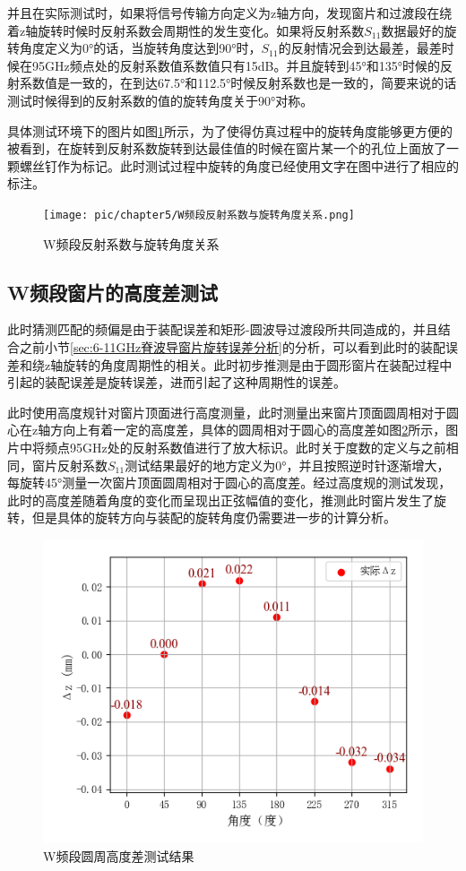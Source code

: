 \documentclass[master]{thesis-uestc}
\begin{document}
并且在实际测试时，如果将信号传输方向定义为z轴方向，发现窗片和过渡段在绕着z轴旋转时候时反射系数会周期性的发生变化。如果将反射系数$S_{11}$数据最好的旋转角度定义为0°的话，当旋转角度达到90°时，$S_{11}$的反射情况会到达最差，最差时候在95GHz频点处的反射系数值系数值只有15dB。并且旋转到45°和135°时候的反射系数值是一致的，在到达67.5°和112.5°时候反射系数也是一致的，简要来说的话测试时候得到的反射系数的值的旋转角度关于90°对称。

具体测试环境下的图片如图\ref{fig:W频段反射系数与旋转角度关系}所示，为了使得仿真过程中的旋转角度能够更方便的被看到，在旋转到反射系数旋转到达最佳值的时候在窗片某一个的孔位上面放了一颗螺丝钉作为标记。此时测试过程中旋转的角度已经使用文字在图中进行了相应的标注。
\begin{figure}[!htb]
    \centering
    \texttt{[image: pic/chapter5/W频段反射系数与旋转角度关系.png]}
    \caption{W频段反射系数与旋转角度关系}
    \label{fig:W频段反射系数与旋转角度关系}
\end{figure}

\subsection{W频段窗片的高度差测试}
此时猜测匹配的频偏是由于装配误差和矩形-圆波导过渡段所共同造成的，并且结合之前小节\ref{sec:6-11GHz脊波导窗片旋转误差分析}的分析，可以看到此时的装配误差和绕z轴旋转的角度周期性的相关。此时初步推测是由于圆形窗片在装配过程中引起的装配误差是旋转误差，进而引起了这种周期性的误差。

此时使用高度规针对窗片顶面进行高度测量，此时测量出来窗片顶面圆周相对于圆心在z轴方向上有着一定的高度差，具体的圆周相对于圆心的高度差如图\ref{fig:W频段圆周高度差测试结果}所示，图片中将频点95GHz处的反射系数值进行了放大标识。此时关于度数的定义与之前相同，窗片反射系数$S_{11}$测试结果最好的地方定义为0°，并且按照逆时针逐渐增大，每旋转45°测量一次窗片顶面圆周相对于圆心的高度差。经过高度规的测试发现，此时的高度差随着角度的变化而呈现出正弦幅值的变化，推测此时窗片发生了旋转，但是具体的旋转方向与装配的旋转角度仍需要进一步的计算分析。
\begin{figure}[!htb]
    \centering
    \includegraphics[width=0.5\linewidth]{pic/chapter5/可视化高度差.png}
    \caption{W频段圆周高度差测试结果}
    \label{fig:W频段圆周高度差测试结果}
\end{figure}
\end{document}
